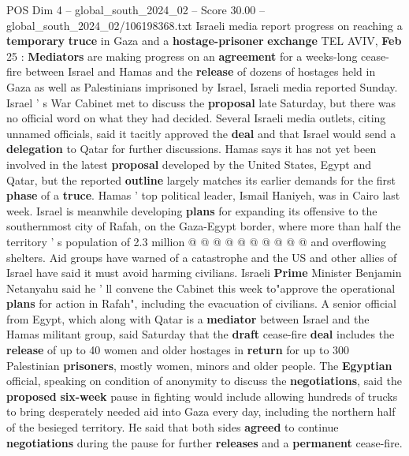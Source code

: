 \begin{textsample}{POS Dim 4 – global\_south\_2024\_02 – Score 30.00 – global\_south\_2024\_02/106198368.txt}  \label{ex:f4_pos_072}
Israeli media report progress on reaching a \textbf{temporary} \textbf{truce} in Gaza and a \textbf{hostage-prisoner} \textbf{exchange} TEL AVIV, \textbf{Feb} 25 : \textbf{Mediators} are making progress on an \textbf{agreement} for a weeks-long cease-fire between Israel and Hamas and the \textbf{release} of dozens of hostages held in Gaza as well as Palestinians imprisoned by Israel, Israeli media reported Sunday.
Israel ' s War Cabinet met to discuss the \textbf{proposal} late Saturday, but there was no official word on what they had decided.
Several Israeli media outlets, citing unnamed officials, said it tacitly approved the \textbf{deal} and that Israel would send a \textbf{delegation} to Qatar for further discussions.
Hamas says it has not yet been involved in the latest \textbf{proposal} developed by the United States, Egypt and Qatar, but the reported \textbf{outline} largely matches its earlier demands for the first \textbf{phase} of a \textbf{truce}.
Hamas ' top political leader, Ismail Haniyeh, was in Cairo last week.
Israel is meanwhile developing \textbf{plans} for expanding its offensive to the southernmost city of Rafah, on the Gaza-Egypt border, where more than half the territory ' s population of 2.3 million @ @ @ @ @ @ @ @ @ @ and overflowing shelters.
Aid groups have warned of a catastrophe and the US and other allies of Israel have said it must avoid harming civilians.
Israeli \textbf{Prime} Minister Benjamin Netanyahu said he ' ll convene the Cabinet this week to"approve the operational \textbf{plans} for action in Rafah", including the evacuation of civilians.
A senior official from Egypt, which along with Qatar is a \textbf{mediator} between Israel and the Hamas militant group, said Saturday that the \textbf{draft} cease-fire \textbf{deal} includes the \textbf{release} of up to 40 women and older hostages in \textbf{return} for up to 300 Palestinian \textbf{prisoners}, mostly women, minors and older people.
The \textbf{Egyptian} official, speaking on condition of anonymity to discuss the \textbf{negotiations}, said the \textbf{proposed} \textbf{six-week} pause in fighting would include allowing hundreds of trucks to bring desperately needed aid into Gaza every day, including the northern half of the besieged territory.
He said that both sides \textbf{agreed} to continue \textbf{negotiations} during the pause for further \textbf{releases} and a \textbf{permanent} cease-fire.

\end{textsample}
